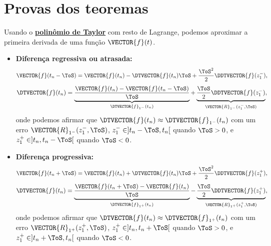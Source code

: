 \section{Provas dos teoremas}


\begin{myproofT}\label{proof:teo:diferenças-finitas:1}
Usando o \hyperref[prop:polytaylor]{\textbf{polinômio de Taylor}} com resto de Lagrange, podemos aproximar 
a primeira derivada de uma função $\VECTOR{f}(t)$.
\begin{itemize}
\item \textbf{Diferença regressiva ou atrasada:}
\begin{equation}
\VECTOR{f}(t_n-\ToS) = \VECTOR{f}(t_n)-\DTVECTOR{f}(t_n)\ToS +\frac{\ToS^2}{2}\DDTVECTOR{f}(z_{1}^{-}),
\end{equation}
\begin{equation}
\DTVECTOR{f}(t_n)=\underbrace{\frac{\VECTOR{f}(t_n)-\VECTOR{f}(t_n-\ToS)}{\ToS}}_{\DTVECTOR{f}_{1^{-}}(t_n)}+
\underbrace{\frac{\ToS}{2}\DDTVECTOR{f}(z_{1}^{-})}_{\VECTOR{R}_{1^{-}}(z_{1}^{-},\ToS)},
\end{equation}
onde podemos afirmar que $\DTVECTOR{f}(t_n)\approx \DTVECTOR{f}_{1^{-}}(t_n)$ com um erro $\VECTOR{R}_{1^{-}}(z_{1}^{-},\ToS)$,
$z_{1}^{-} \in ]t_n-\ToS,t_n[$ quando $\ToS>0$, e $z_{1}^{+} \in ]t_n,t_n-\ToS[$ quando $\ToS<0$.

\item \textbf{Diferença progressiva:}
\begin{equation}
\VECTOR{f}(t_n+\ToS) = \VECTOR{f}(t_n)+\DTVECTOR{f}(t_n)\ToS +\frac{\ToS^2}{2}\DDTVECTOR{f}(z_{1}^{+}),
\end{equation}
\begin{equation}
\DTVECTOR{f}(t_n)=\underbrace{\frac{\VECTOR{f}(t_n+\ToS) - \VECTOR{f}(t_n)}{\ToS}}_{\DTVECTOR{f}_{1^{+}}(t_n)}-
\underbrace{\frac{\ToS}{2}\DDTVECTOR{f}(z_{1}^{+})}_{\VECTOR{R}_{1^{+}}(z_{1}^{+},\ToS)},
\end{equation}
onde podemos afirmar que $\DTVECTOR{f}(t_n)\approx \DTVECTOR{f}_{1^{+}}(t_n)$ com um erro $\VECTOR{R}_{1^{+}}(z_{1}^{+},\ToS)$,
$z_{1}^{+} \in ]t_n,t_n+\ToS[$ quando $\ToS>0$, e $z_{1}^{+} \in ]t_n+\ToS,t_n[$ quando $\ToS<0$.


\end{itemize}
\end{myproofT}
